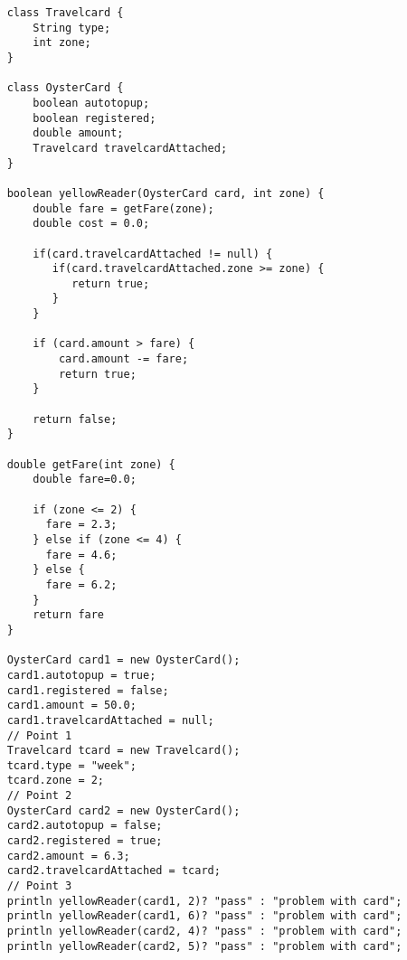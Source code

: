 \documentclass{article}
\begin{document}
\begin{verbatim}
    class Travelcard {
        String type;
        int zone;
    }
    
    class OysterCard {
        boolean autotopup;
        boolean registered;
        double amount;
        Travelcard travelcardAttached;
    }
    
    boolean yellowReader(OysterCard card, int zone) {
        double fare = getFare(zone);
        double cost = 0.0;
      
        if(card.travelcardAttached != null) {
           if(card.travelcardAttached.zone >= zone) {
              return true;
           }
        }
      
        if (card.amount > fare) {
            card.amount -= fare;
            return true;
        }
   
        return false;
    }
                  
    double getFare(int zone) {
        double fare=0.0;
      
        if (zone <= 2) {
          fare = 2.3;
        } else if (zone <= 4) {
          fare = 4.6;
        } else {
          fare = 6.2;
        }         
        return fare
    }
    
    OysterCard card1 = new OysterCard();
    card1.autotopup = true;
    card1.registered = false;
    card1.amount = 50.0;
    card1.travelcardAttached = null;
    // Point 1
    Travelcard tcard = new Travelcard();
    tcard.type = "week";
    tcard.zone = 2;
    // Point 2
    OysterCard card2 = new OysterCard();
    card2.autotopup = false;
    card2.registered = true;
    card2.amount = 6.3;
    card2.travelcardAttached = tcard;
    // Point 3
    println yellowReader(card1, 2)? "pass" : "problem with card";
    println yellowReader(card1, 6)? "pass" : "problem with card";
    println yellowReader(card2, 4)? "pass" : "problem with card";
    println yellowReader(card2, 5)? "pass" : "problem with card";
\end{verbatim}
\end{document}
